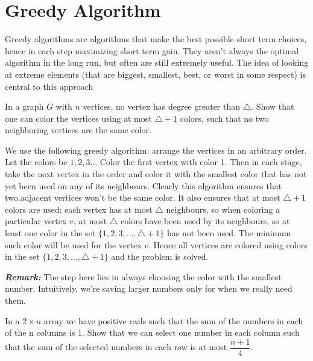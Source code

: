 \documentclass[a4paper,11pt]{book}
\begin{document}
\section{Greedy Algorithm}
\begin{center}
\textit{}
\end{center} 
Greedy algorithms are algorithms that make the best possible
short term choices, hence in each step maximizing short term
gain. They aren’t always the optimal algorithm in the long run, but often are still extremely useful. The idea of looking at extreme elements (that are biggest, smallest, best, or worst in some respect) is central to this approach
\begin{example}
In a graph $G$ with $n$ vertices, no vertex has degree greater than $\triangle$. Show that one can color the vertices using at most $\triangle +1$ colors, such that no two neighboring vertices are the same color.
\end{example}
\begin{soln}
We use the following greedy algorithm: arrange the vertices in an arbitrary order. Let the colors be $1, 2, 3\dots$ Color the first vertex with color 1. Then in each stage, take the next vertex in the order and color it with the smallest color that has not yet been used on any of its neighbours. Clearly this algorithm ensures that two.adjacent vertices won’t be the same color. It also ensures that at most $\triangle +1$ colors are used: each vertex has at most $\triangle$ neighbours, so when coloring a particular vertex $v$, at most $\triangle$ colors have been used by its neighbours, so at least one color in the set $\{1, 2, 3, \dots,\triangle+1\}$ has not been used. The minimum such color will be used for the vertex $v$. Hence all vertices are colored using colors in the set $\{1, 2, 3,\dots, \triangle+1\}$ and the problem is solved.
\end{soln}
\textbf{\textit{ Remark:}} The  step here lies in always choosing the color with the smallest number. Intuitively, we’re saving larger numbers only for when we really need them.
\begin{example}
In a $2 \times n$ array we have positive reals such that the sum of the numbers in each of the n columns is 1. Show that we can select one number in each column such that the sum of the selected numbers in each row is at most $\dfrac{n+1}{4}$.
\end{example}
\end{document}
